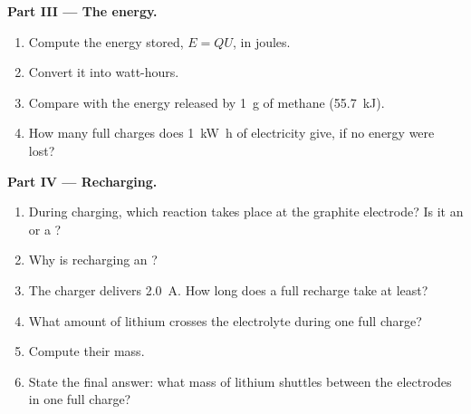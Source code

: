 \begin{problem}
\medskip
\noindent\textbf{Part III --- The energy.}
\begin{enumerate}[resume]
  \item Compute the energy stored, $E = Q U$, in joules.
  \item Convert it into watt-hours.
  \item Compare with the energy released by  \qty{1}{g} of methane
        (\qty{55.7}{kJ}).
  \item How many full charges does \qty{1}{kW.h} of electricity give, if
        no energy were lost?
\end{enumerate}

\medskip
\noindent\textbf{Part IV --- Recharging.}
\begin{enumerate}[resume]
  \item During charging, which reaction takes place at the graphite
        electrode? Is it an  or a ?
  \item Why is recharging an ?
  \item The charger delivers \qty{2.0}{A}. How long does a full recharge
        take at least?
  \item What amount of lithium  crosses the electrolyte during one
        full charge?
  \item Compute their mass.
  \item State the final answer: what mass of lithium shuttles between the
        electrodes in one full charge?
\end{enumerate}
\end{problem}
